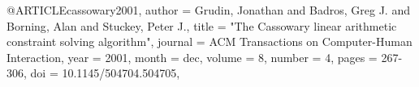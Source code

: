 
@ARTICLE{cassowary2001,
   author = {{Grudin}, Jonathan and {Badros}, Greg J. and {Borning}, Alan and {Stuckey}, Peter J.},
    title = "{The Cassowary linear arithmetic constraint solving algorithm}",
    journal = {ACM Transactions on Computer-Human Interaction},
       year = 2001,
      month = dec,
     volume = {8},
     number = {4},
      pages = {267-306},
        doi = {10.1145/504704.504705},
}
